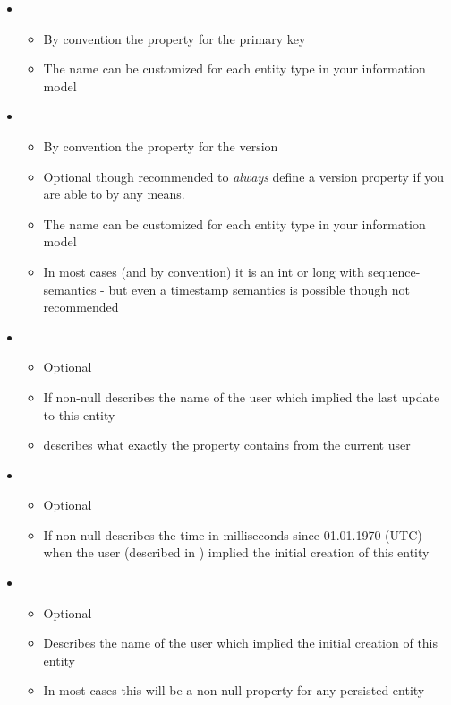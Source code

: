 \begin{itemize}
	\item {}
		\begin{itemize}
			\item By convention the property for the primary key
			\item The name can be customized for each entity type in your information model
		\end{itemize}
	\item {}
		\begin{itemize}
			\item By convention the property for the version
			\item Optional though recommended to \emph{always} define a version property if you are able to by any means.
			\item The name can be customized for each entity type in your information model
			\item In most cases (and by convention) it is an int or long with sequence-semantics - but even a timestamp semantics is possible though not recommended
		\end{itemize}
	\item {}
		\begin{itemize}
			\item Optional
			\item If non-null describes the name of the user which implied the last update to this entity
			\item {} describes what exactly the property contains from the current user
		\end{itemize}
	\item {}
		\begin{itemize}
			\item Optional
			\item If non-null describes the time in milliseconds since 01.01.1970 (UTC) when the user (described in ) implied the initial creation of this entity
		\end{itemize}
	\item {}
		\begin{itemize}
			\item Optional
			\item	Describes the name of the user which implied the initial creation of this entity
			\item In most cases this will be a non-null property for any persisted entity

\end{itemize}
\end{itemize}
